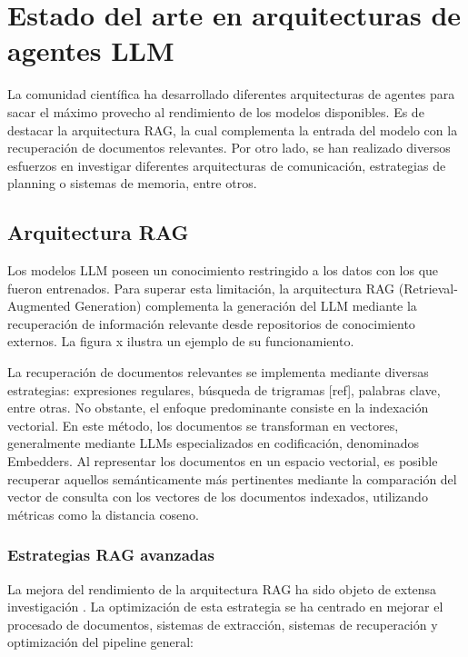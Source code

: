 \section{Estado del arte en arquitecturas de agentes LLM}

La comunidad científica ha desarrollado diferentes arquitecturas de agentes para sacar el máximo provecho al rendimiento de los modelos disponibles. Es de destacar la arquitectura RAG, la cual complementa la entrada del modelo con la recuperación de documentos relevantes. Por otro lado, se han realizado diversos esfuerzos en investigar diferentes arquitecturas de comunicación, estrategias de planning o sistemas de memoria, entre otros.

\subsection{Arquitectura RAG}

Los modelos LLM poseen un conocimiento restringido a los datos con los que fueron entrenados. Para superar esta limitación, la arquitectura RAG (Retrieval-Augmented Generation) complementa la generación del LLM mediante la recuperación de información relevante desde repositorios de conocimiento externos. La figura x ilustra un ejemplo de su funcionamiento.    

La recuperación de documentos relevantes se implementa mediante diversas estrategias: expresiones regulares, búsqueda de trigramas [ref], palabras clave, entre otras. No obstante, el enfoque predominante consiste en la indexación vectorial. En este método, los documentos se transforman en vectores, generalmente mediante LLMs especializados en codificación, denominados Embedders. Al representar los documentos en un espacio vectorial, es posible recuperar aquellos semánticamente más pertinentes mediante la comparación del vector de consulta con los vectores de los documentos indexados, utilizando métricas como la distancia coseno.

\subsubsection{Estrategias RAG avanzadas}
La mejora del rendimiento de la arquitectura RAG ha sido objeto de extensa investigación \cite{zhu_retrieving_2021}\cite{gao_retrieval-augmented_2024}. La optimización de esta estrategia se ha centrado en mejorar el procesado de documentos, sistemas de extracción, sistemas de recuperación y optimización del pipeline general: 


